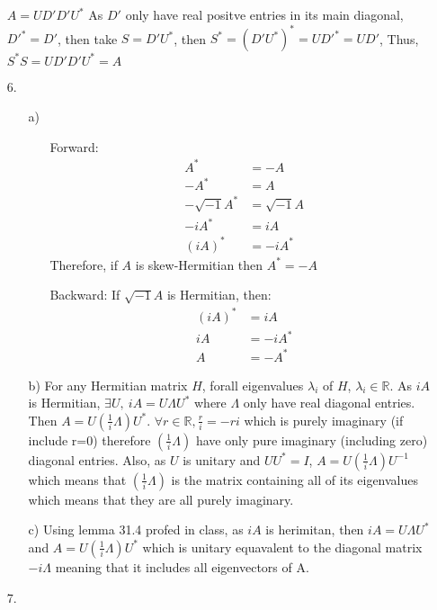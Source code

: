 \documentclass{article}
\begin{document}
\begin{itemize}
    \(A=UD'D'U^*\) As \(D'\) only have real positve entries in its main diagonal, \(D'^*=D'\), then take \(S=D'U^*\), then \(S^*=(D'U^*)^*=UD'^*=UD'\), Thus, \(S^*S=UD'D'U^*=A\)
    \item [6.]
    \begin{itemize}
        \item [a)]\
        \begin{itemize}
            \item [Forward:]
            \begin{align*}
                A^*&=-A\\
                -A^*&=A\\
                -\sqrt{-1}A^*&=\sqrt{-1}A\\
                -iA^*&=iA\\
                (iA)^*&=-iA^*
            \end{align*}
            Therefore, if \(A\) is skew-Hermitian then \(A^*=-A\)
            \item [Backward:] If \(\sqrt{-1}A\) is Hermitian, then:
            \begin{align*}
                (iA)^*&=iA\\
                iA &=-iA^*\\
                A&=-A^*
            \end{align*}
        \end{itemize}
        \item [b)]For any Hermitian matrix \(H\), forall eigenvalues \(\lambda_i\) of \(H\), \(\lambda_i\in \mathbb{R}\). As \(iA\) is Hermitian, 
        \(\exists U,\ iA=U\Lambda U^*\) where \(\Lambda\) only have real diagonal entries. Then \(A=U(\frac{1}{i}\Lambda )U^*\). \(\forall r\in \mathbb{R}, \frac{r}{i}=-ri\) which is purely imaginary (if include r=0)
        therefore \(\left(\frac{1}{i}\Lambda\right)\) have only pure imaginary (including zero) diagonal entries.
        Also, as \(U\) is unitary and \(UU^*=I\), \(A=U\left(\frac{1}{i}\Lambda\right)U^{-1}\) which means that \(\left(\frac{1}{i}\Lambda\right)\) is the matrix containing all of its eigenvalues which means that they are all purely imaginary.
        \item [c)]Using lemma 31.4 profed in class, as \(iA\) is herimitan, then \(iA=U\Lambda U^*\) and \(A=U\left(\frac{1}{i}\Lambda\right)U^*\) which is unitary equavalent to the diagonal matrix \(-i\Lambda\) meaning that it includes all eigenvectors of A.
    \end{itemize}
    \item [7.]

\end{itemize}
\end{document}
